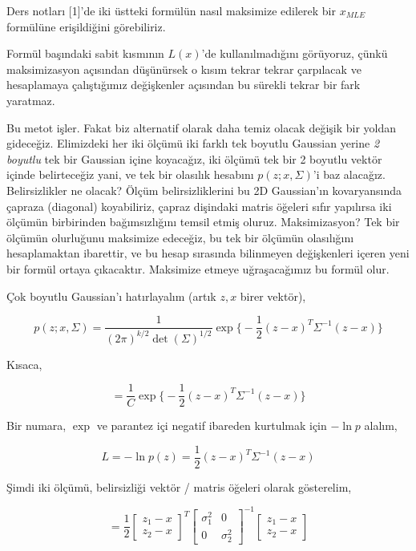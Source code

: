 \documentclass[12pt,fleqn]{article}\usepackage{../../common}
\begin{document}
Ders notları [1]'de iki üstteki formülün nasıl maksimize edilerek bir
$x_{MLE}$ formülüne erişildiğini görebiliriz. 

Formül başındaki sabit kısmının $L(x)$'de kullanılmadığını görüyoruz, çünkü
maksimizasyon açısından düşünürsek o kısım tekrar tekrar çarpılacak ve
hesaplamaya çalıştığımız değişkenler açısından bu sürekli tekrar bir
fark yaratmaz.

Bu metot işler. Fakat biz alternatif olarak daha temiz olacak değişik bir
yoldan gideceğiz. Elimizdeki her iki ölçümü iki farklı tek boyutlu Gaussian
yerine {\em 2 boyutlu} tek bir Gaussian içine koyacağız, iki ölçümü tek
bir 2 boyutlu vektör içinde belirteceğiz yani, ve tek bir olasılık hesabını
$p(z;x,\Sigma)$'i baz alacağız.  Belirsizlikler ne olacak? Ölçüm
belirsizliklerini bu 2D Gaussian'ın kovaryansında çapraza (diagonal)
koyabiliriz, çapraz dişindaki matris öğeleri sıfır yapılırsa iki ölçümün
birbirinden bağımsızlığını temsil etmiş oluruz. Maksimizasyon? Tek bir
ölçümün olurluğunu maksimize edeceğiz, bu tek bir ölçümün olasılığını
hesaplamaktan ibarettir, ve bu hesap sırasında bilinmeyen değişkenleri
içeren yeni bir formül ortaya çıkacaktır. Maksimize etmeye uğraşacağımız bu
formül olur.

Çok boyutlu Gaussian'ı hatırlayalım (artık $z,x$ birer vektör),

$$ p(z;x,\Sigma) = 
\frac{ 1}{(2\pi)^{k/2} \det(\Sigma)^{1/2}} \exp 
\bigg\{ 
-\frac{ 1}{2}(z-x)^T\Sigma^{-1}(z-x)
\bigg\} $$

Kısaca,

$$ =  \frac{ 1}{C} \exp 
\bigg\{ 
-\frac{ 1}{2}(z-x)^T\Sigma^{-1}(z-x)
\bigg\} $$

Bir numara, $\exp$ ve parantez içi negatif ibareden kurtulmak için
$-\ln p$ alalım,

$$ L = -\ln p(z) = 
\frac{ 1}{2}(z-x)^T\Sigma^{-1}(z-x)
$$

Şimdi iki ölçümü, belirsizliği vektör / matris öğeleri olarak gösterelim, 

$$ = \frac{1}{2}  
\left[\begin{array}{c}
z_1-x \\ z_2-x
\end{array}\right]^T
\left[\begin{array}{cc}
\sigma_1^2 & 0 \\
0 & \sigma_2^2 
\end{array}\right]^{-1}
\left[\begin{array}{c}
z_1-x \\ z_2-x
\end{array}\right]
$$
\end{document}
